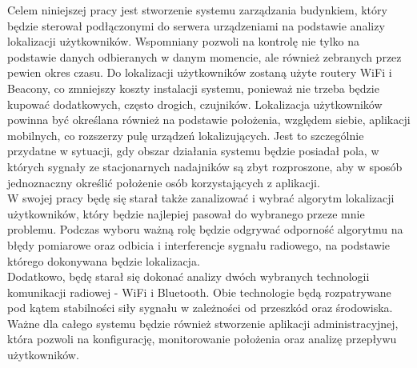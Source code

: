 Celem niniejszej pracy jest stworzenie systemu zarządzania budynkiem, który będzie sterował podłączonymi do serwera urządzeniami na podstawie analizy lokalizacji użytkowników. Wspomniany pozwoli na kontrolę nie tylko na podstawie danych odbieranych w danym momencie, ale również zebranych przez pewien okres czasu. Do lokalizacji użytkowników zostaną użyte routery WiFi i Beacony, co zmniejszy koszty instalacji systemu, ponieważ nie trzeba będzie kupować dodatkowych, często drogich, czujników. Lokalizacja użytkowników powinna być określana również na podstawie położenia, względem siebie, aplikacji mobilnych, co rozszerzy pulę urządzeń lokalizujących. Jest to szczególnie przydatne w sytuacji, gdy obszar działania systemu będzie posiadał pola, w których sygnały ze stacjonarnych nadajników są zbyt rozproszone, aby w sposób jednoznaczny określić położenie osób korzystających z aplikacji.\\
W swojej pracy będę się starał także zanalizować i wybrać algorytm lokalizacji użytkowników, który będzie najlepiej pasował do wybranego przeze mnie problemu. Podczas wyboru ważną rolę będzie odgrywać odporność algorytmu na błędy pomiarowe oraz odbicia i interferencje sygnału radiowego, na podstawie którego dokonywana będzie lokalizacja.\\
Dodatkowo, będę starał się dokonać analizy dwóch wybranych technologii komunikacji radiowej - WiFi i Bluetooth. Obie technologie będą rozpatrywane pod kątem stabilności siły sygnału w zależności od przeszkód oraz środowiska.\\
Ważne dla całego systemu będzie również stworzenie aplikacji administracyjnej, która pozwoli na konfigurację, monitorowanie położenia oraz analizę przepływu użytkowników.\\